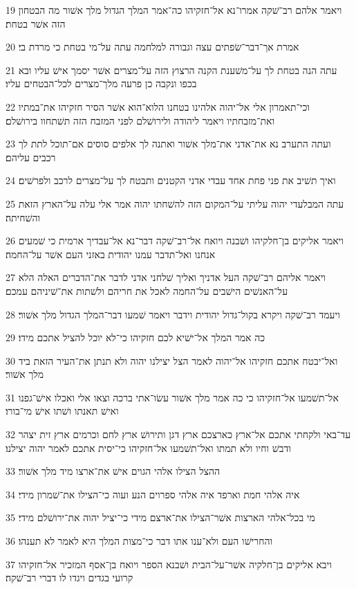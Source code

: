 \par 19 ויאמר אלהם רב־שׁקה אמרו־נא אל־חזקיהו כה־אמר המלך הגדול מלך אשׁור מה הבטחון הזה אשׁר בטחת׃
\par 20 אמרת אך־דבר־שׂפתים עצה וגבורה למלחמה עתה על־מי בטחת כי מרדת בי׃
\par 21 עתה הנה בטחת לך על־משׁענת הקנה הרצוץ הזה על־מצרים אשׁר יסמך אישׁ עליו ובא בכפו ונקבה כן פרעה מלך־מצרים לכל־הבטחים עליו׃
\par 22 וכי־תאמרון אלי אל־יהוה אלהינו בטחנו הלוא־הוא אשׁר הסיר חזקיהו את־במתיו ואת־מזבחתיו ויאמר ליהודה ולירושׁלם לפני המזבח הזה תשׁתחוו בירושׁלם׃
\par 23 ועתה התערב נא את־אדני את־מלך אשׁור ואתנה לך אלפים סוסים אם־תוכל לתת לך רכבים עליהם׃
\par 24 ואיך תשׁיב את פני פחת אחד עבדי אדני הקטנים ותבטח לך על־מצרים לרכב ולפרשׁים׃
\par 25 עתה המבלעדי יהוה עליתי על־המקום הזה להשׁחתו יהוה אמר אלי עלה על־הארץ הזאת והשׁחיתה׃
\par 26 ויאמר אליקים בן־חלקיהו ושׁבנה ויואח אל־רב־שׁקה דבר־נא אל־עבדיך ארמית כי שׁמעים אנחנו ואל־תדבר עמנו יהודית באזני העם אשׁר על־החמה׃
\par 27 ויאמר אליהם רב־שׁקה העל אדניך ואליך שׁלחני אדני לדבר את־הדברים האלה הלא על־האנשׁים הישׁבים על־החמה לאכל את חריהם ולשׁתות את־שׁיניהם עמכם׃
\par 28 ויעמד רב־שׁקה ויקרא בקול־גדול יהודית וידבר ויאמר שׁמעו דבר־המלך הגדול מלך אשׁור׃
\par 29 כה אמר המלך אל־ישׁיא לכם חזקיהו כי־לא יוכל להציל אתכם מידו׃
\par 30 ואל־יבטח אתכם חזקיהו אל־יהוה לאמר הצל יצילנו יהוה ולא תנתן את־העיר הזאת ביד מלך אשׁור׃
\par 31 אל־תשׁמעו אל־חזקיהו כי כה אמר מלך אשׁור עשׂו־אתי ברכה וצאו אלי ואכלו אישׁ־גפנו ואישׁ תאנתו ושׁתו אישׁ מי־בורו׃
\par 32 עד־באי ולקחתי אתכם אל־ארץ כארצכם ארץ דגן ותירושׁ ארץ לחם וכרמים ארץ זית יצהר ודבשׁ וחיו ולא תמתו ואל־תשׁמעו אל־חזקיהו כי־יסית אתכם לאמר יהוה יצילנו׃
\par 33 ההצל הצילו אלהי הגוים אישׁ את־ארצו מיד מלך אשׁור׃
\par 34 איה אלהי חמת וארפד איה אלהי ספרוים הנע ועוה כי־הצילו את־שׁמרון מידי׃
\par 35 מי בכל־אלהי הארצות אשׁר־הצילו את־ארצם מידי כי־יציל יהוה את־ירושׁלם מידי׃
\par 36 והחרישׁו העם ולא־ענו אתו דבר כי־מצות המלך היא לאמר לא תענהו׃
\par 37 ויבא אליקים בן־חלקיה אשׁר־על־הבית ושׁבנא הספר ויואח בן־אסף המזכיר אל־חזקיהו קרועי בגדים ויגדו לו דברי רב־שׁקה׃

